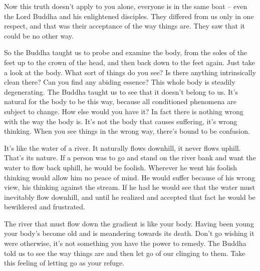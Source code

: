 Now this truth doesn't apply to you alone, everyone is in the same boat -- even the Lord Buddha and his enlightened disciples. They differed from us only in one respect, and that was their acceptance of the way things are. They saw that it could be no other way.

So the Buddha taught us to probe and examine the body, from the soles of the feet up to the crown of the head, and then back down to the feet again. Just take a look at the body. What sort of things do you see? Is there anything intrinsically clean there? Can you find any abiding essence? This whole body is steadily degenerating. The Buddha taught us to see that it doesn't belong to us. It's natural for the body to be this way, because all conditioned phenomena are subject to change. How else would you have it? In fact there is nothing wrong with the way the body is. It's not the body that causes suffering, it's wrong thinking. When you see things in the wrong way, there's bound to be confusion.

It's like the water of a river. It naturally flows downhill, it never flows uphill. That's its nature. If a person was to go and stand on the river bank and want the water to flow back uphill, he would be foolish. Wherever he went his foolish thinking would allow him no peace of mind. He would suffer because of his wrong view, his thinking against the stream. If he had  he would see that the water must inevitably flow downhill, and until he realized and accepted that fact he would be bewildered and frustrated.

The river that must flow down the gradient is like your body. Having been young your body's become old and is meandering towards its death. Don't go wishing it were otherwise, it's not something you have the power to remedy. The Buddha told us to see the way things are and then let go of our clinging to them. Take this feeling of letting go as your refuge.

